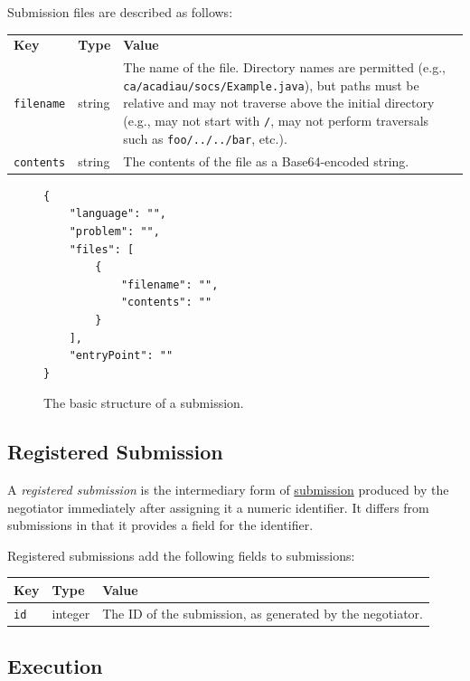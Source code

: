 \documentclass[11pt,letterpaper]{article}
\begin{document}
Submission files are described as follows:

\nopagebreak
\begin{tabulary}{\textwidth}{ | l | l | L | }
    \hline
    \textbf{Key} & \textbf{Type} & \textbf{Value} \\
    \texttt{filename} & string & The name of the file. Directory names are
        permitted (e.g., \texttt{ca/acadiau/socs/Example.java}), but paths must
        be relative and may not traverse above the initial directory (e.g., may
        not start with \texttt{/}, may not perform traversals such as
        \texttt{foo/../../bar}, etc.). \\
    \hline
    \texttt{contents} & string & The contents of the file as a Base64-encoded
        string. \\
    \hline
\end{tabulary}

\begin{figure}
\begin{lstlisting}
{
    "language": "",
    "problem": "",
    "files": [
        {
            "filename": "",
            "contents": ""
        }
    ],
    "entryPoint": ""
}
\end{lstlisting}
\caption{The basic structure of a submission.}
\label{formats-sub-listing}
\end{figure}

\subsection{Registered Submission}
\label{formats-reg-sub}

A \emph{registered submission} is the intermediary form of
\hyperref[formats-sub]{submission} produced by the negotiator immediately
after assigning it a numeric identifier. It differs from submissions in that it
provides a field for the identifier.

Registered submissions add the following fields to submissions:

\nopagebreak
\begin{tabulary}{\textwidth}{ | l | l | L | }
    \hline
    \textbf{Key} & \textbf{Type} & \textbf{Value} \\
    \hline
    \texttt{id} & integer & The ID of the submission, as generated by the
        negotiator. \\
    \hline
\end{tabulary}

\subsection{Execution}
\label{formats-exec}
\end{document}
